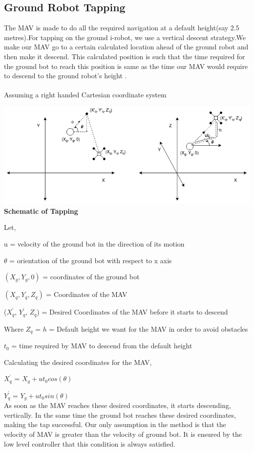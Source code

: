 \documentclass[12pt]{article}
\begin{document}
\subsection{Ground Robot Tapping}
    The MAV is made to do all the required navigation at a default height(say 2.5 metres).For tapping on the ground i-robot, we use a vertical descent strategy.We make our MAV go to a certain calculated location ahead of the ground robot and then make it descend. This calculated position is such that the time required for the ground bot to reach this position is same as the time our MAV would require to descend to the ground robot's height .\\
\\ Assuming a right handed Cartesian coordinate system \\
\begin{center}
\includegraphics[scale=0.5]{tap}\\
\textbf{Schematic of Tapping}
\end{center}
Let,
    
u = velocity of the ground bot in the direction of its motion 

$\theta$ = orientation of the ground bot with respect to x axis 

$(X_g, Y_g, 0)$ = coordinates of the ground bot 

$(X_q, Y_q, Z_q)$ = Coordinates of the MAV 

($X_q^’$, $Y_q^’$, $Z_q$) = Desired Coordinates of the MAV before it starts to descend 

Where $Z_q$ = $h$ = Default height we want for the MAV in order to avoid obstacles 
        
$t_0$ = time required by MAV to descend from the default height 
 
Calculating the desired coordinates for the MAV, 
 
$X_q^’$ = $X_g + ut_0cos(\theta)$

$Y_q^’$  = $Y_g + ut_0sin(\theta)$ \\
    As soon as the MAV reaches these desired coordinates, it starts descending, vertically. In the same time the ground bot reaches these desired coordinates, making the tap successful. 
    Our only assumption in the method is that the velocity of MAV is greater than the velocity of ground bot. It is ensured by the low level controller that this condition is always satisfied.
\end{document}
